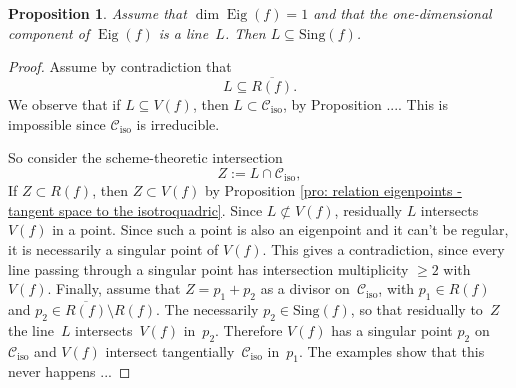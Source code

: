 \documentclass[11pt, a4paper, reqno, captions=tableheading,bibliography=totoc]{scrartcl}
\theoremstyle{plain}
\newtheorem{prop}[lemma]{Proposition}
\theoremstyle{definition}
\newcommand{\iso}{\mathcal{C}_{\mathrm{iso}}}
\newcommand{\Eig}[1]{\operatorname{Eig}\left( {#1} \right)}
\begin{document}
\begin{prop}
Assume that $\dim \Eig{f} = 1$ and that the one-dimensional component of $\Eig{f}$ is a line~$L$.
Then $L \subseteq \mathrm{Sing}(f)$.
\end{prop}
\begin{proof}
Assume by contradiction that
%
\[
 L \subseteq {\overline{R(f)}}.
\]
%
We observe that if $L \subseteq V(f)$, then $L\subset \iso$, by Proposition ....
This is impossible since $\iso$ is irreducible.

So consider the scheme-theoretic intersection
%
\[
Z:= L \cap \iso,
\]
%
If $Z \subset R(f)$, then $Z \subset V(f)$ by Proposition \ref{pro: relation eigenpoints - tangent space to the isotroquadric}. Since $L \not \subset V(f)$, residually $L$ intersects $V(f)$ in a point. Since such a point is also an eigenpoint and it can't be regular, it is necessarily a singular point of $V(f)$. This gives a contradiction, since every line passing through a singular point has intersection multiplicity $\ge 2$ with $V(f)$.
Finally, assume that $Z = p_1 + p_2$ as a divisor on~$\iso$, with $p_1 \in R(f)$ and $p_2\in {\overline {R(f)}} \setminus R(f)$. The necessarily $p_2 \in \mathrm{Sing}(f)$, so that residually to~$Z$ the line~$L$ intersects~$V(f)$ in~$p_2$. Therefore $V(f)$ has a singular point $p_2$ on $\iso$ and $V(f)$ intersect tangentially~$\iso$ in~$p_1$.
The examples show that this never happens ...
\end{proof}
\end{document}
